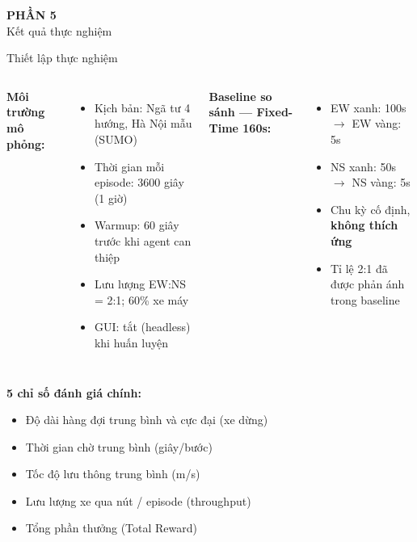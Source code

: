 
\begin{frame}
  \centering
  \Huge \textbf{PHẦN 5} \\[0.5cm]
  \LARGE Kết quả thực nghiệm
\end{frame}

\begin{frame}{Thiết lập thực nghiệm}
\begin{columns}
\textbf{Môi trường mô phỏng:}
\begin{itemize}
    \item Kịch bản: Ngã tư 4 hướng, Hà Nội mẫu (SUMO)
    \item Thời gian mỗi episode: 3600 giây (1 giờ)
    \item Warmup: 60 giây trước khi agent can thiệp
    \item Lưu lượng EW:NS = 2:1; 60\% xe máy
    \item GUI: tắt (headless) khi huấn luyện
\end{itemize}

\textbf{Baseline so sánh — Fixed-Time 160s:}
\begin{itemize}
    \item EW xanh: 100s $\to$ EW vàng: 5s
    \item NS xanh: 50s $\to$ NS vàng: 5s
    \item Chu kỳ cố định, \textbf{không thích ứng}
    \item Tỉ lệ 2:1 đã được phản ánh trong baseline
\end{itemize}
\end{columns}

\vspace{8pt}
\textbf{5 chỉ số đánh giá chính:}
\begin{itemize}
    \item Độ dài hàng đợi trung bình và cực đại (xe dừng)
    \item Thời gian chờ trung bình (giây/bước)
    \item Tốc độ lưu thông trung bình (m/s)
    \item Lưu lượng xe qua nút / episode (throughput)
    \item Tổng phần thưởng (Total Reward)
\end{itemize}
\end{frame}


